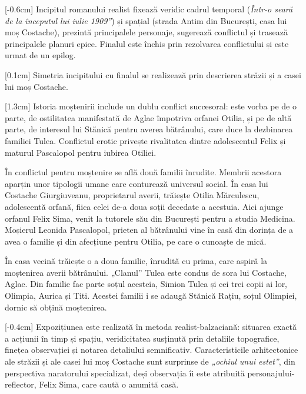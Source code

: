 \documentclass[
12pt,
a4paper
]{article}
\begin{document}
[-0.6cm]
Incipitul romanului realist fixează veridic cadrul temporal (\textit{Într-o seară de la începutul lui iulie 1909”}) și spațial (strada Antim din București, casa lui moș Costache), prezintă principalele personaje, sugerează conflictul și trasează principalele planuri epice. Finalul este închis prin rezolvarea conflictului și este urmat de un epilog.

[0.1cm]
Simetria incipitului cu finalul se realizează prin descrierea străzii și a casei lui moș Costache.

[1.3cm]
Istoria moștenirii include un dublu conflict succesoral: este vorba pe de o parte, de ostilitatea manifestată de Aglae împotriva orfanei Otilia, și pe de altă parte, de interesul lui Stănică pentru averea bătrânului, care duce la dezbinarea familiei Tulea. Conflictul erotic privește rivalitatea dintre adolescentul Felix și maturul Pascalopol pentru iubirea Otiliei.

În conflictul pentru moștenire se află două familii înrudite. Membrii acestora aparțin unor tipologii umane care conturează universul social. În casa lui Costache Giurgiuveanu, proprietarul averii, trăiește Otilia Mărculescu, adolescentă orfană, fiica celei de-a doua soții decedate a acestuia. Aici ajunge orfanul Felix Sima, venit la tutorele său din București pentru a studia Medicina. Moșierul Leonida Pascalopol, prieten al bătrânului vine în casă din dorința de a avea o familie și din afecțiune pentru Otilia, pe care o cunoaște de mică.

În casa vecină trăiește o a doua familie, înrudită cu prima, care aspiră la moștenirea averii bătrânului. „Clanul” Tulea este condus de sora lui Costache, Aglae. Din familie fac parte soțul acesteia, Simion Tulea și cei trei copii ai lor, Olimpia, Aurica și Titi. Acestei familii i se adaugă Stănică Rațiu, soțul Olimpiei, dornic să obțină moștenirea.

[-0.4cm]
Expozițiunea este realizată în metoda realist-balzaciană: situarea exactă a acțiunii în timp și spațiu, veridicitatea susținută prin detaliile topografice, finețea observației și notarea detaliului semnificativ. Caracteristicile arhitectonice ale străzii și ale casei lui moș Costache sunt surprinse de \textit{„ochiul unui estet”}, din perspectiva naratorului specializat, deși observația îi este atribuită personajului-reflector, Felix Sima, care caută o anumită casă.
\end{document}
